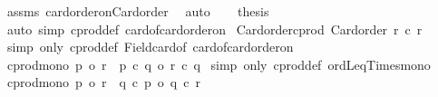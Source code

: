 \begin{isabellebody}
\ assms\ card{\isacharunderscore}{\kern0pt}order{\isacharunderscore}{\kern0pt}on{\isacharunderscore}{\kern0pt}Card{\isacharunderscore}{\kern0pt}order\ \isamarkupfalse%
\ auto\isanewline
\ \ \isamarkupfalse%
\ {\isacharquery}{\kern0pt}thesis\ \isamarkupfalse%
\ {\isacharparenleft}{\kern0pt}auto\ simp{\isacharcolon}{\kern0pt}\ cprod{\isacharunderscore}{\kern0pt}def\ card{\isacharunderscore}{\kern0pt}of{\isacharunderscore}{\kern0pt}card{\isacharunderscore}{\kern0pt}order{\isacharunderscore}{\kern0pt}on{\isacharparenright}{\kern0pt}\isanewline
{}\isamarkupfalse%
%
\endisatagproof
{\isafoldproof}%
%
\isadelimproof
\isanewline
%
\endisadelimproof
\isanewline
{}\isamarkupfalse%
\ Card{\isacharunderscore}{\kern0pt}order{\isacharunderscore}{\kern0pt}cprod{\isacharcolon}{\kern0pt}\ {\isachardoublequoteopen}Card{\isacharunderscore}{\kern0pt}order\ {\isacharparenleft}{\kern0pt}r{}\ {\isacharasterisk}{\kern0pt}c\ r{}{\isacharparenright}{\kern0pt}{\isachardoublequoteclose}\isanewline
%
\isadelimproof
%
\endisadelimproof
%
\isatagproof
{}\isamarkupfalse%
\ {\isacharparenleft}{\kern0pt}simp\ only{\isacharcolon}{\kern0pt}\ cprod{\isacharunderscore}{\kern0pt}def\ Field{\isacharunderscore}{\kern0pt}card{\isacharunderscore}{\kern0pt}of\ card{\isacharunderscore}{\kern0pt}of{\isacharunderscore}{\kern0pt}card{\isacharunderscore}{\kern0pt}order{\isacharunderscore}{\kern0pt}on{\isacharparenright}{\kern0pt}%
\endisatagproof
{\isafoldproof}%
%
\isadelimproof
\isanewline
%
\endisadelimproof
\isanewline
{}\isamarkupfalse%
\ cprod{\isacharunderscore}{\kern0pt}mono{}{\isacharcolon}{\kern0pt}\ {\isachardoublequoteopen}p{}\ {\isasymle}o\ r{}\ {\isasymLongrightarrow}\ p{}\ {\isacharasterisk}{\kern0pt}c\ q\ {\isasymle}o\ r{}\ {\isacharasterisk}{\kern0pt}c\ q{\isachardoublequoteclose}\isanewline
%
\isadelimproof
%
\endisadelimproof
%
\isatagproof
{}\isamarkupfalse%
\ {\isacharparenleft}{\kern0pt}simp\ only{\isacharcolon}{\kern0pt}\ cprod{\isacharunderscore}{\kern0pt}def\ ordLeq{\isacharunderscore}{\kern0pt}Times{\isacharunderscore}{\kern0pt}mono{}{\isacharparenright}{\kern0pt}%
\endisatagproof
{\isafoldproof}%
%
\isadelimproof
\isanewline
%
\endisadelimproof
\isanewline
{}\isamarkupfalse%
\ cprod{\isacharunderscore}{\kern0pt}mono{}{\isacharcolon}{\kern0pt}\ {\isachardoublequoteopen}p{}\ {\isasymle}o\ r{}\ {\isasymLongrightarrow}\ q\ {\isacharasterisk}{\kern0pt}c\ p{}\ {\isasymle}o\ q\ {\isacharasterisk}{\kern0pt}c\ r{}{\isachardoublequoteclose}\isanewline

\end{isabellebody}
